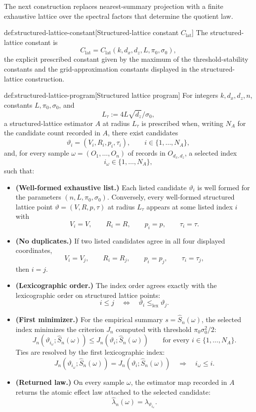 The next construction replaces nearest-summary projection with a finite exhaustive lattice over the spectral factors that determine the quotient law.

\begin{definitionv}{def:structured-lattice-constant}[Structured-lattice constant \(C_{\mathrm{lat}}\)]
The structured-lattice constant is
\[
C_{\mathrm{lat}}
=
C_{\mathrm{lat}}(k,d_x,d_z,L,\pi_0,\sigma_0),
\]
the explicit prescribed constant given by the maximum of the threshold-stability constants and the grid-approximation constants displayed in the structured-lattice construction.
\end{definitionv}

\begin{algorithmv}{def:structured-lattice-program}[Structured lattice program]
For integers \(k,d_x,d_z,n\), constants \(L,\pi_0,\sigma_0\), and
\[
L_\tau:=4L\sqrt{d_z}/\sigma_0,
\]
a structured-lattice estimator \(A\) at radius \(L_\tau\) is prescribed when, writing \(N_A\) for the candidate count recorded in \(A\), there exist candidates
\[
\vartheta_i=(V_i,R_i,p_i,\tau_i),\qquad i\in\{1,\ldots,N_A\},
\]
and, for every sample \(\omega=(O_1,\ldots,O_n)\) of records in \(O_{d_x,d_z}\), a selected index
\[
i_\omega\in\{1,\ldots,N_A\},
\]
such that:
\begin{itemize}
\item \textbf{(Well-formed exhaustive list.)} Each listed candidate \(\vartheta_i\) is well formed for the parameters \((n,L,\pi_0,\sigma_0)\). Conversely, every well-formed structured lattice point \(\vartheta=(V,R,p,\tau)\) at radius \(L_\tau\) appears at some listed index \(i\) with
\[
V_i=V,\qquad R_i=R,\qquad p_i=p,\qquad \tau_i=\tau .
\]
\item \textbf{(No duplicates.)} If two listed candidates agree in all four displayed coordinates,
\[
V_i=V_j,\qquad R_i=R_j,\qquad p_i=p_j,\qquad \tau_i=\tau_j,
\]
then \(i=j\).
\item \textbf{(Lexicographic order.)} The index order agrees exactly with the lexicographic order on structured lattice points:
\[
i\le j
\quad\Longleftrightarrow\quad
\vartheta_i\le_{\mathrm{lex}}\vartheta_j .
\]
\item \textbf{(First minimizer.)} For the empirical summary \(s=\widehat S_n(\omega)\), the selected index minimizes the criterion \(J_n\) computed with threshold \(\pi_0\sigma_0^2/2\):
\[
J_n(\vartheta_{i_\omega};\widehat S_n(\omega))
\le
J_n(\vartheta_i;\widehat S_n(\omega))
\qquad\text{for every }i\in\{1,\ldots,N_A\}.
\]
Ties are resolved by the first lexicographic index:
\[
J_n(\vartheta_{i_\omega};\widehat S_n(\omega))
=
J_n(\vartheta_i;\widehat S_n(\omega))
\quad\Longrightarrow\quad
i_\omega\le i .
\]
\item \textbf{(Returned law.)} On every sample \(\omega\), the estimator map recorded in \(A\) returns the atomic effect law attached to the selected candidate:
\[
\widehat\lambda_n(\omega)=\lambda_{\vartheta_{i_\omega}} .
\]
\end{itemize}
\end{algorithmv}

